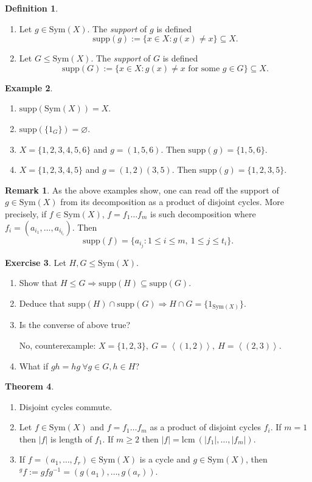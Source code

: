 \documentclass[a4paper]{article}
\newcommand{\la}{\left\langle}
\newcommand{\ra}{\right\rangle}
\newcommand{\Sym}{\text{Sym}}
\newcommand{\supp}{\text{supp}}
\newcommand{\lcm}{\text{lcm}\ }
\theoremstyle{definition}
\newtheorem{defn}{Definition}[subsection]
\newtheorem{thm}[defn]{Theorem}
\newtheorem{example}[defn]{Example}
\newtheorem{exe}[defn]{Exercise}
\newtheorem*{remark}{Remark}
\begin{document}
\begin{defn}
\begin{enumerate}
\item Let $g\in\Sym(X)$. The \textit{support} of $g$ is defined
\[
\supp(g):=\{x\in X:g(x)\neq x\} \subseteq X.
\]
\item Let $G\leq \Sym(X)$. The \textit{support} of $G$ is defined
\[
\supp(G):=\{x\in X:g(x)\neq x\text{ for some }g\in G\} \subseteq X.
\]
\end{enumerate}
\end{defn}
\begin{example}
\begin{enumerate}
\item $\supp(\Sym(X))=X$.
\item $\supp(\{1_G\})=\varnothing$.
\item $X=\{1,2,3,4,5,6\}$ and $g=(1,5,6)$. Then $\supp(g)=\{1,5,6\}$.
\item $X=\{1,2,3,4,5\}$ and $g=(1,2)(3,5)$. Then $\supp(g)=\{1,2,3,5\}$.
\end{enumerate}
\end{example}
\begin{remark}
As the above examples show, one can read off the support of $g\in\Sym(X)$ from its decomposition as a product of disjoint cycles. More precisely, if $f\in\Sym(X)$, $f=f_1\ldots f_m$ is such decomposition where $f_i=\left(a_{i_1},\ldots,a_{i_{t_i}}\right)$. Then
\[
\supp(f)=\{a_{i_j} : 1\leq i\leq m, \ 1\leq j \leq t_i\}.
\]
\end{remark}
\begin{exe}
Let $H,G\leq \Sym(X)$.
\begin{enumerate}
\item Show that $H\leq G\Rightarrow\supp(H)\subseteq\supp(G)$.
\item Deduce that $\supp(H)\cap\supp(G)\Rightarrow H\cap G =\{1_{\Sym(X)}\}$.
\item Is the converse of above true?

No, counterexample: $X=\{1,2,3\},\ G=\la(1,2)\ra,\ H=\la(2,3)\ra$.
\item What if $gh=hg \ \forall g\in G,h\in H$?
\end{enumerate}
\end{exe}

\begin{thm}
\label{thm:disjointcycle}
\begin{enumerate}
\item Disjoint cycles commute.
\item Let $f\in\Sym(X)$ and $f=f_1\ldots f_m$ as a product of disjoint cycles $f_i$. If $m=1$ then $|f|$ is length of $f_1$. If $m\geq 2$ then $|f|=\lcm (|f_1|,\ldots,|f_m|)$.
\item If $f=(a_1,\ldots,f_r)\in\Sym(X)$ is a cycle and $g\in\Sym(X)$, then $^gf:=gfg^{-1}=\left(g(a_1),\ldots,g(a_r)\right)$.
\end{enumerate}
\end{thm}
\end{document}
